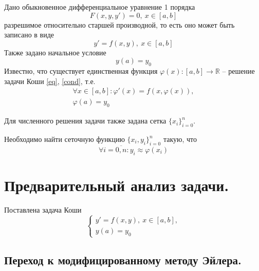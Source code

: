 \documentclass[a4paper, 12pt]{article}
\begin{document}
	Дано обыкновенное дифференциальное уравнение 1 порядка
	\begin{equation}
		F(x,y,y')=0,\ x\in[a,b]
	\end{equation}
	разрешимое относительно старшей производной, то есть оно может быть записано в виде
	\begin{equation} \label{eq}
		y'=f(x,y),\ x\in[a,b]
	\end{equation}
	Также задано начальное условие
	\begin{equation} \label{cond}
		y(a)=y_0
	\end{equation}
	Известно, что существует единственная функция $\varphi(x):[a,b]\rightarrow\mathbb{R}$ -- решение задачи Коши \eqref{eq}, \eqref{cond}, т.е.
	\begin{equation}
		\begin{gathered}
			\forall x\in[a,b]: \varphi'(x)=f(x,\varphi(x)),\\
			\varphi(a)=y_0
		\end{gathered}
	\end{equation}

	Для численного решения задачи также задана сетка $\{x_i\}_{i=0}^n$.
	
	Необходимо найти сеточную функцию $\{x_i,y_i\}_{i=0}^n$ такую, что
	\begin{equation}
		\forall i=\overline{0,n}: y_i\approx\varphi(x_i)
	\end{equation}

	\section{Предварительный анализ задачи.}
	
	Поставлена задача Коши 
	\begin{equation}
		\begin{cases}
			y'=f(x,y),\ x\in[a,b],\\
			y(a)=y_0
		\end{cases}
	\end{equation}
	
	\subsection{Переход к модифицированному методу Эйлера.}
	
\end{document}
